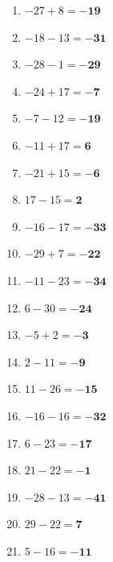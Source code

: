 \documentclass[a4paper,12pt]{article} %
\begin{document}
\begin{enumerate}

  \item \(-27 + 8 = \mathbf{-19}\) %

  \item \(-18 - 13 = \mathbf{-31}\) %

  \item \(-28 - 1 = \mathbf{-29}\) %

  \item \(-24 + 17 = \mathbf{-7}\) %

  \item \(-7 - 12 = \mathbf{-19}\) %

  \item \(-11 + 17 = \mathbf{6}\) %

  \item \(-21 + 15 = \mathbf{-6}\) %

  \item \(17 - 15 = \mathbf{2}\) %

  \item \(-16 - 17 = \mathbf{-33}\) %

  \item \(-29 + 7 = \mathbf{-22}\) %

  \item \(-11 - 23 = \mathbf{-34}\) %

  \item \(6 - 30 = \mathbf{-24}\) %

  \item \(-5 + 2 = \mathbf{-3}\) %

  \item \(2 - 11 = \mathbf{-9}\) %

  \item \(11 - 26 = \mathbf{-15}\) %

  \item \(-16 - 16 = \mathbf{-32}\) %

  \item \(6 - 23 = \mathbf{-17}\) %

  \item \(21 - 22 = \mathbf{-1}\) %

  \item \(-28 - 13 = \mathbf{-41}\) %

  \item \(29 - 22 = \mathbf{7}\) %

  \item \(5 - 16 = \mathbf{-11}\) %


\end{enumerate}
\end{document}
